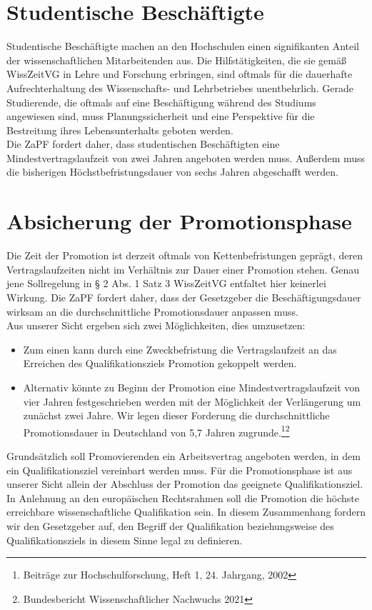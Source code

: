 \documentclass[DIV=calc]{scrartcl}
\begin{document}
\section{Studentische Beschäftigte}
Studentische Beschäftigte machen an den Hochschulen einen signifikanten Anteil der wissenschaftlichen Mitarbeitenden aus. Die Hilfstätigkeiten, die sie gemäß WissZeitVG in Lehre und Forschung erbringen, sind oftmals für die dauerhafte Aufrechterhaltung des Wissenschafts- und Lehrbetriebes unentbehrlich. Gerade Studierende, die oftmals auf eine Beschäftigung während des Studiums angewiesen sind, muss Planungssicherheit und eine Perspektive für die Bestreitung ihres Lebensunterhalts geboten werden.\\
Die ZaPF fordert daher, dass studentischen Beschäftigten eine Mindestvertragslaufzeit von zwei Jahren angeboten werden muss. Außerdem muss die bisherigen Höchstbefristungsdauer von sechs Jahren abgeschafft werden.

\section{Absicherung der Promotionsphase}
Die Zeit der Promotion ist derzeit oftmals von Kettenbefristungen geprägt, deren Vertragslaufzeiten nicht im Verhältnis zur Dauer einer Promotion stehen. Genau jene Sollregelung in § 2 Abs. 1 Satz 3 WissZeitVG entfaltet hier keinerlei Wirkung. Die ZaPF fordert daher, dass der Gesetzgeber die Beschäftigungsdauer wirksam an die durchschnittliche Promotionsdauer anpassen muss.\\
Aus unserer Sicht ergeben sich zwei Möglichkeiten, dies umzusetzen:
\begin{itemize}
\item Zum einen kann durch eine Zweckbefristung die Vertragslaufzeit an das Erreichen des Qualifikationsziels Promotion gekoppelt werden.
\item Alternativ könnte zu Beginn der Promotion eine Mindestvertragslaufzeit von vier Jahren festgeschrieben werden mit der Möglichkeit der Verlängerung um zunächst zwei Jahre. Wir legen dieser Forderung die durchschnittliche Promotionsdauer in Deutschland von 5,7 Jahren zugrunde.\footnote{Beiträge zur Hochschulforschung, Heft 1, 24. Jahrgang, 2002}\footnote{Bundesbericht Wissenschaftlicher Nachwuchs 2021}
\end{itemize}
Grundsätzlich soll Promovierenden ein Arbeitsvertrag angeboten werden, in dem ein Qualifikationsziel vereinbart werden muss. Für die Promotionsphase ist aus unserer Sicht allein der Abschluss der Promotion das geeignete Qualifikationsziel. In Anlehnung an den europäischen Rechtsrahmen soll die Promotion die höchste erreichbare wissenschaftliche Qualifikation sein. In diesem Zusammenhang fordern wir den Gesetzgeber auf, den Begriff der Qualifikation beziehungsweise des Qualifikationsziels in diesem Sinne legal zu definieren.
\end{document}
